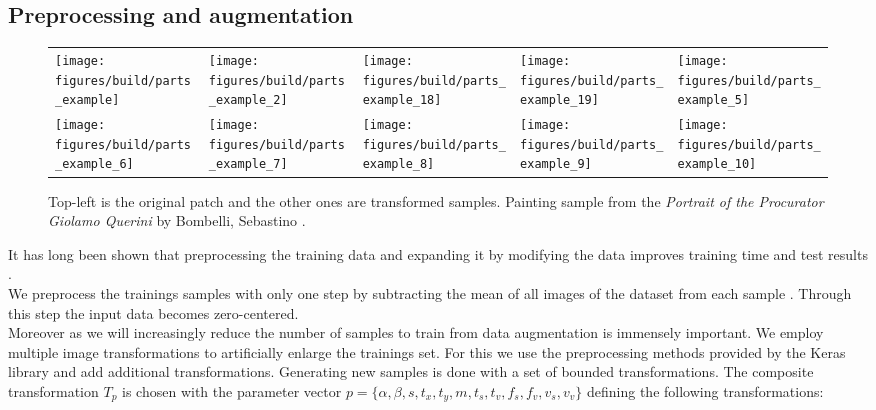 \subsection{Preprocessing and augmentation}
\label{sec:pipeline:training:augment}
\begin{figure}[htb]
    \begin{tabularx}{\textwidth}{XXXXX}
        \texttt{[image: figures/build/parts\_example]} &
        \texttt{[image: figures/build/parts\_example\_2]} &
        \texttt{[image: figures/build/parts\_example\_18]} &
        \texttt{[image: figures/build/parts\_example\_19]} &
        \texttt{[image: figures/build/parts\_example\_5]} \\

        \texttt{[image: figures/build/parts\_example\_6]} &
        \texttt{[image: figures/build/parts\_example\_7]} &
        \texttt{[image: figures/build/parts\_example\_8]} &
        \texttt{[image: figures/build/parts\_example\_9]} &
        \texttt{[image: figures/build/parts\_example\_10]}
    \end{tabularx}
	\caption{Top-left is the original patch and the other ones are transformed samples. Painting sample from the \textit{Portrait of the Procurator Giolamo Querini} by Bombelli, Sebastino \citep{bombelli_retrato_1669}.}
    \label{fig:augmentation}
\end{figure}
It has long been shown that preprocessing the training data and expanding it by modifying the data improves training time and test results \citep{dosovitskiy_discriminative_2014}.\\
We preprocess the trainings samples with only one step by subtracting the mean of all images of the dataset from each sample \citep{krizhevsky_imagenet_2012}. Through this step the input data becomes zero-centered.\\
Moreover as we will increasingly reduce the number of samples to train from data augmentation is immensely important.  We employ multiple image transformations to artificially enlarge the trainings set. For this we use the preprocessing methods provided by the Keras library \citep{chollet_keras:_2015} and add additional transformations. Generating new samples is done with a set of bounded transformations. The composite transformation $T_p$ is chosen with the parameter vector $p = \{\alpha, \beta, s, t_x, t_y, m, t_s, t_v, f_s, f_v, v_s, v_v\}$ defining the following transformations:
